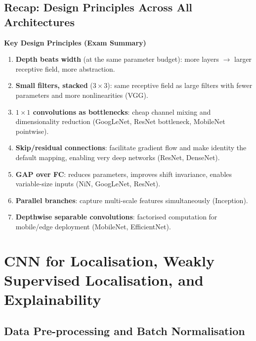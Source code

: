 \documentclass[11pt,a4paper]{article}
\begin{document}
\subsection{Recap: Design Principles Across All Architectures}

\begin{tcolorbox}[colback=WarningRedBg,colframe=WarningRed,boxrule=0.8pt,arc=3pt]
\textbf{Key Design Principles (Exam Summary)}
\begin{enumerate}
  \item \textbf{Depth beats width} (at the same parameter budget): more layers $\to$ larger receptive field, more abstraction.
  \item \textbf{Small filters, stacked} ($3\times3$): same receptive field as large filters with fewer parameters and more nonlinearities (VGG).
  \item \textbf{$1\times1$ convolutions as bottlenecks}: cheap channel mixing and dimensionality reduction (GoogLeNet, ResNet bottleneck, MobileNet pointwise).
  \item \textbf{Skip/residual connections}: facilitate gradient flow and make identity the default mapping, enabling very deep networks (ResNet, DenseNet).
  \item \textbf{GAP over FC}: reduces parameters, improves shift invariance, enables variable-size inputs (NiN, GoogLeNet, ResNet).
  \item \textbf{Parallel branches}: capture multi-scale features simultaneously (Inception).
  \item \textbf{Depthwise separable convolutions}: factorised computation for mobile/edge deployment (MobileNet, EfficientNet).
\end{enumerate}
\end{tcolorbox}

\section{CNN for Localisation, Weakly Supervised Localisation, and Explainability}
\label{sec:lecture10}

\subsection{Data Pre-processing and Batch Normalisation}
\end{document}
